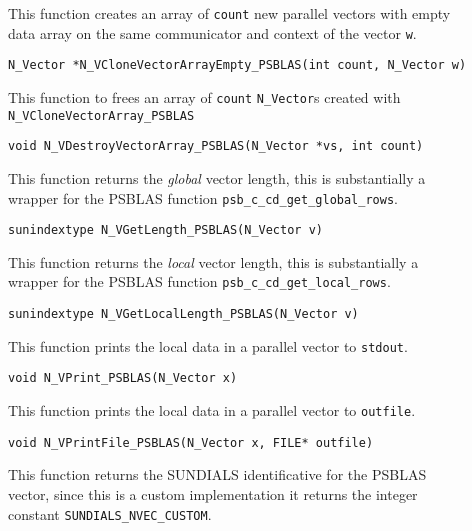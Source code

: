 \documentclass[twoside,a4paper]{refart}
\begin{document}
\begin{description}
	\item[] This function creates an array of \lstinline[style=CStyle]|count| new parallel vectors with empty data array on the same communicator and context of the vector \lstinline[style=CStyle]|w|. 
	
	 \lstinline[style=CStyle]|N_Vector *N_VCloneVectorArrayEmpty_PSBLAS(int count, N_Vector w)|
	
	\item[] This function to frees an array of \lstinline[style=CStyle]|count| \texttt{N\_Vector}s created with \texttt{N\_VCloneVectorArray\_PSBLAS}
	
	 \lstinline[style=CStyle]|void N_VDestroyVectorArray_PSBLAS(N_Vector *vs, int count)|
	
	\item[] This function returns the \emph{global} vector length, this is substantially a wrapper for the PSBLAS function \lstinline[style=CStyle]|psb_c_cd_get_global_rows|.
	
	 \lstinline[style=CStyle]|sunindextype N_VGetLength_PSBLAS(N_Vector v)|
	
	\item[] This function returns the \emph{local} vector length, this is substantially a wrapper for the PSBLAS function \lstinline[style=CStyle]|psb_c_cd_get_local_rows|.
	
	 \lstinline[style=CStyle]|sunindextype N_VGetLocalLength_PSBLAS(N_Vector v)|
	
	\item[] This function prints the local data in a parallel vector to \lstinline[style=CStyle]|stdout|.
	
	 \lstinline[style=CStyle]|void N_VPrint_PSBLAS(N_Vector x)|
	
	\item[] This function prints the local data in a parallel vector to \lstinline[style=CStyle]|outfile|.
	
	 \lstinline[style=CStyle]|void N_VPrintFile_PSBLAS(N_Vector x, FILE* outfile)|
	
	\item[] This function returns the SUNDIALS identificative for the PSBLAS vector, since this is a custom implementation it returns the integer constant \lstinline[style=CStyle]|SUNDIALS_NVEC_CUSTOM|.
	

\end{description}
\end{document}
